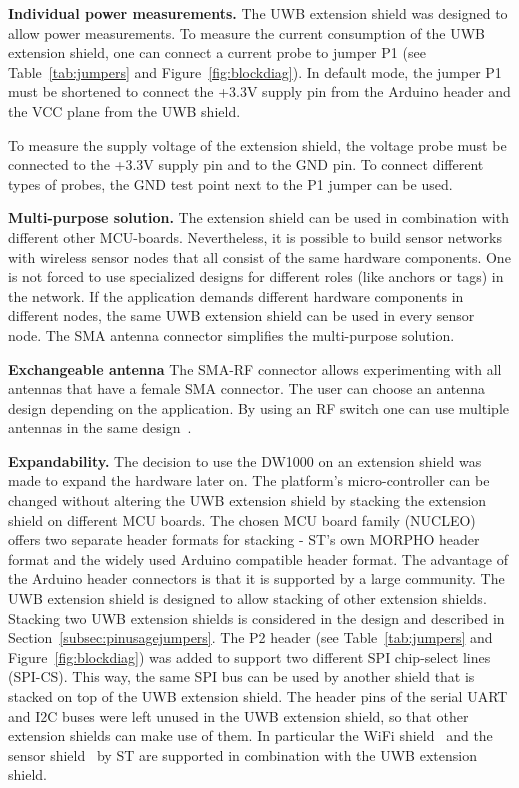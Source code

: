 \documentclass[journal,comsoc]{IEEEtran}
\begin{document}
\vspace*{0.5em}
\noindent\textbf{Individual power measurements.} The UWB extension shield was designed to allow power measurements. 
To measure the current consumption of the UWB extension shield, one can connect a current probe to jumper P1 (see Table~\ref{tab:jumpers} and Figure~\ref{fig:blockdiag}). 
In default mode, the jumper P1 must be shortened to connect the +3.3V supply pin from the Arduino header and the VCC plane from the UWB shield.

To measure the supply voltage of the extension shield, the voltage probe must be connected to the +3.3V supply pin and to the GND pin. 
To connect different types of probes, the GND test point next to the P1 jumper can be used.

\vspace*{0.5em}
\noindent\textbf{Multi-purpose solution.} The extension shield can be used in combination with different other MCU-boards. 
Nevertheless, it is possible to build sensor networks with wireless sensor nodes that all consist of the same hardware components. 
One is not forced to use specialized designs for different roles (like anchors or tags) in the network. 
If the application demands different hardware components in different nodes, the same UWB extension shield can be used in every sensor node. 
The SMA antenna connector simplifies the multi-purpose solution. 

\vspace*{0.5em}
\noindent\textbf{Exchangeable antenna} The SMA-RF connector allows experimenting with all antennas that have a female SMA connector. 
The user can choose an antenna design depending on the application. 
By using an RF switch one can use multiple antennas in the same design~\cite{Grosswindhager_Switchable_2017}.

\vspace*{0.5em}
\noindent\textbf{Expandability.} The decision to use the DW1000 on an extension shield was made to expand the hardware later on.
The platform's micro-controller can be changed without altering the UWB extension shield by stacking the extension shield on different MCU boards.
The chosen MCU board family (NUCLEO) offers two separate header formats for stacking - ST's own MORPHO header format and the widely used Arduino compatible header format. 
The advantage of the Arduino header connectors is that it is supported by a large community.
The UWB extension shield is designed to allow stacking of other extension shields.
Stacking two UWB extension shields is considered in the design and described in Section~\ref{subsec:pinusagejumpers}.
The P2 header (see Table~\ref{tab:jumpers} and Figure~\ref{fig:blockdiag}) was added to support two different SPI chip-select lines (SPI-CS).
This way, the same SPI bus can be used by another shield that is stacked on top of the UWB extension shield.
The header pins of the serial UART and I2C buses were left unused in the UWB extension shield, so that other extension shields can make use of them.
In particular the WiFi shield~\cite{wifiboard} and the sensor shield~\cite{memsboard} by ST are supported in combination with the UWB extension shield.
\end{document}
